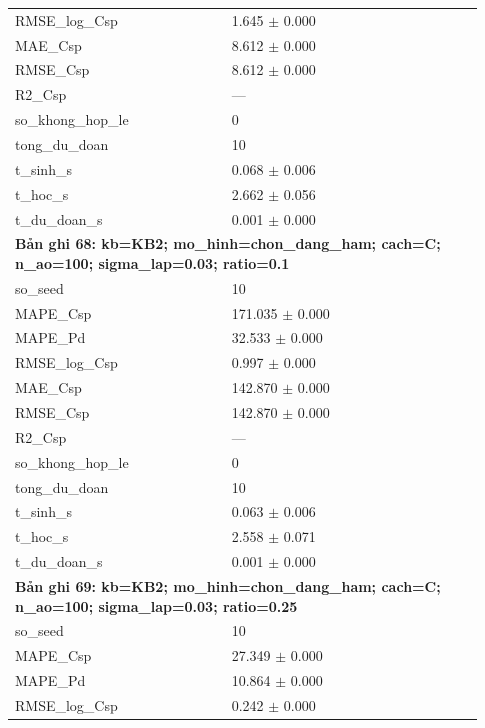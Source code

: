 \begin{longtable}{p{0.43\linewidth}p{0.50\linewidth}}
RMSE\_\allowbreak log\_\allowbreak Csp & 1.645 $\pm$ 0.000 \\
MAE\_\allowbreak Csp & 8.612 $\pm$ 0.000 \\
RMSE\_\allowbreak Csp & 8.612 $\pm$ 0.000 \\
R2\_\allowbreak Csp & — \\
so\_\allowbreak khong\_\allowbreak hop\_\allowbreak le & 0 \\
tong\_\allowbreak du\_\allowbreak doan & 10 \\
t\_\allowbreak sinh\_\allowbreak s & 0.068 $\pm$ 0.006 \\
t\_\allowbreak hoc\_\allowbreak s & 2.662 $\pm$ 0.056 \\
t\_\allowbreak du\_\allowbreak doan\_\allowbreak s & 0.001 $\pm$ 0.000 \\
\midrule
\multicolumn{2}{p{0.95\linewidth}}{\textbf{Bản ghi 68: kb=KB2; mo\_hinh=chon\_dang\_ham; cach=C; n\_ao=100; sigma\_lap=0.03; ratio=0.1}} \\
so\_\allowbreak seed & 10 \\
MAPE\_\allowbreak Csp & 171.035 $\pm$ 0.000 \\
MAPE\_\allowbreak Pd & 32.533 $\pm$ 0.000 \\
RMSE\_\allowbreak log\_\allowbreak Csp & 0.997 $\pm$ 0.000 \\
MAE\_\allowbreak Csp & 142.870 $\pm$ 0.000 \\
RMSE\_\allowbreak Csp & 142.870 $\pm$ 0.000 \\
R2\_\allowbreak Csp & — \\
so\_\allowbreak khong\_\allowbreak hop\_\allowbreak le & 0 \\
tong\_\allowbreak du\_\allowbreak doan & 10 \\
t\_\allowbreak sinh\_\allowbreak s & 0.063 $\pm$ 0.006 \\
t\_\allowbreak hoc\_\allowbreak s & 2.558 $\pm$ 0.071 \\
t\_\allowbreak du\_\allowbreak doan\_\allowbreak s & 0.001 $\pm$ 0.000 \\
\midrule
\multicolumn{2}{p{0.95\linewidth}}{\textbf{Bản ghi 69: kb=KB2; mo\_hinh=chon\_dang\_ham; cach=C; n\_ao=100; sigma\_lap=0.03; ratio=0.25}} \\
so\_\allowbreak seed & 10 \\
MAPE\_\allowbreak Csp & 27.349 $\pm$ 0.000 \\
MAPE\_\allowbreak Pd & 10.864 $\pm$ 0.000 \\
RMSE\_\allowbreak log\_\allowbreak Csp & 0.242 $\pm$ 0.000 \\

\end{longtable}
